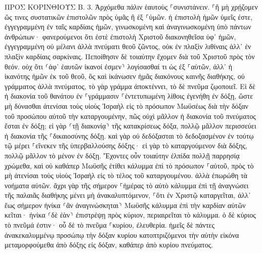 \documentclass[twoside, 9pt]{extreport}
\begin{document}
ΠΡΟΣ ΚΟΡΙΝΘΙΟΥΣ Β.
3.
Ἀρχόμεθα πάλιν ἑαυτοὺς ⸀συνιστάνειν. ⸀ἢ μὴ χρῄζομεν ὥς τινες συστατικῶν ἐπιστολῶν πρὸς ὑμᾶς ἢ ἐξ ⸀ὑμῶν. 
ἡ ἐπιστολὴ ἡμῶν ὑμεῖς ἐστε, ἐγγεγραμμένη ἐν ταῖς καρδίαις ἡμῶν, γινωσκομένη καὶ ἀναγινωσκομένη ὑπὸ πάντων ἀνθρώπων· 
φανερούμενοι ὅτι ἐστὲ ἐπιστολὴ Χριστοῦ διακονηθεῖσα ὑφ᾽ ἡμῶν, ἐγγεγραμμένη οὐ μέλανι ἀλλὰ πνεύματι θεοῦ ζῶντος, οὐκ ἐν πλαξὶν λιθίναις ἀλλ᾽ ἐν πλαξὶν καρδίαις σαρκίναις. 
Πεποίθησιν δὲ τοιαύτην ἔχομεν διὰ τοῦ Χριστοῦ πρὸς τὸν θεόν. 
οὐχ ὅτι ⸂ἀφ᾽ ἑαυτῶν ἱκανοί ἐσμεν⸃ λογίσασθαί τι ὡς ἐξ ⸀αὑτῶν, ἀλλ᾽ ἡ ἱκανότης ἡμῶν ἐκ τοῦ θεοῦ, 
ὃς καὶ ἱκάνωσεν ἡμᾶς διακόνους καινῆς διαθήκης, οὐ γράμματος ἀλλὰ πνεύματος, τὸ γὰρ γράμμα ἀποκτέννει, τὸ δὲ πνεῦμα ζῳοποιεῖ. 
Εἰ δὲ ἡ διακονία τοῦ θανάτου ἐν ⸀γράμμασιν ⸀ἐντετυπωμένη λίθοις ἐγενήθη ἐν δόξῃ, ὥστε μὴ δύνασθαι ἀτενίσαι τοὺς υἱοὺς Ἰσραὴλ εἰς τὸ πρόσωπον Μωϋσέως διὰ τὴν δόξαν τοῦ προσώπου αὐτοῦ τὴν καταργουμένην, 
πῶς οὐχὶ μᾶλλον ἡ διακονία τοῦ πνεύματος ἔσται ἐν δόξῃ; 
εἰ γὰρ ⸂τῇ διακονίᾳ⸃ τῆς κατακρίσεως δόξα, πολλῷ μᾶλλον περισσεύει ἡ διακονία τῆς ⸀δικαιοσύνης δόξῃ. 
καὶ γὰρ οὐ δεδόξασται τὸ δεδοξασμένον ἐν τούτῳ τῷ μέρει ⸀εἵνεκεν τῆς ὑπερβαλλούσης δόξης· 
εἰ γὰρ τὸ καταργούμενον διὰ δόξης, πολλῷ μᾶλλον τὸ μένον ἐν δόξῃ. 
Ἔχοντες οὖν τοιαύτην ἐλπίδα πολλῇ παρρησίᾳ χρώμεθα, 
καὶ οὐ καθάπερ Μωϋσῆς ἐτίθει κάλυμμα ἐπὶ τὸ πρόσωπον ⸀αὐτοῦ, πρὸς τὸ μὴ ἀτενίσαι τοὺς υἱοὺς Ἰσραὴλ εἰς τὸ τέλος τοῦ καταργουμένου. 
ἀλλὰ ἐπωρώθη τὰ νοήματα αὐτῶν. ἄχρι γὰρ τῆς σήμερον ⸀ἡμέρας τὸ αὐτὸ κάλυμμα ἐπὶ τῇ ἀναγνώσει τῆς παλαιᾶς διαθήκης μένει μὴ ἀνακαλυπτόμενον, ⸀ὅτι ἐν Χριστῷ καταργεῖται, 
ἀλλ᾽ ἕως σήμερον ἡνίκα ⸂ἂν ἀναγινώσκηται⸃ Μωϋσῆς κάλυμμα ἐπὶ τὴν καρδίαν αὐτῶν κεῖται· 
ἡνίκα ⸂δὲ ἐὰν⸃ ἐπιστρέψῃ πρὸς κύριον, περιαιρεῖται τὸ κάλυμμα. 
ὁ δὲ κύριος τὸ πνεῦμά ἐστιν· οὗ δὲ τὸ πνεῦμα ⸀κυρίου, ἐλευθερία. 
ἡμεῖς δὲ πάντες ἀνακεκαλυμμένῳ προσώπῳ τὴν δόξαν κυρίου κατοπτριζόμενοι τὴν αὐτὴν εἰκόνα μεταμορφούμεθα ἀπὸ δόξης εἰς δόξαν, καθάπερ ἀπὸ κυρίου πνεύματος. 
\end{document}
